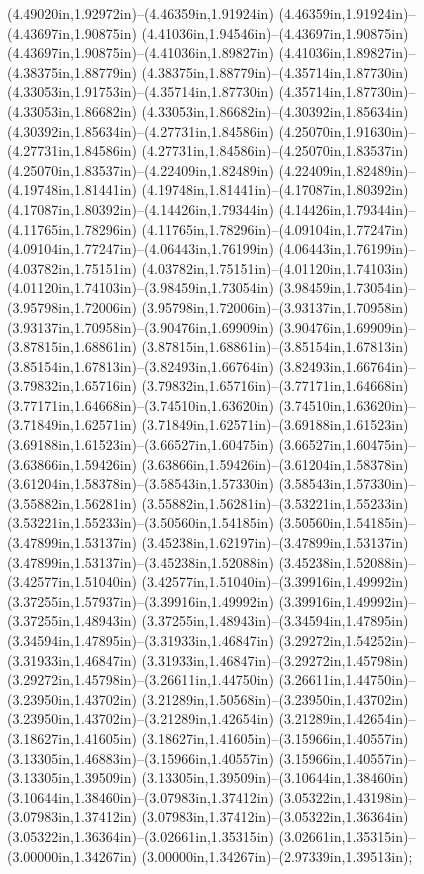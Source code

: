 (4.49020in,1.92972in)--(4.46359in,1.91924in) (4.46359in,1.91924in)--(4.43697in,1.90875in) (4.41036in,1.94546in)--(4.43697in,1.90875in) (4.43697in,1.90875in)--(4.41036in,1.89827in) (4.41036in,1.89827in)--(4.38375in,1.88779in) (4.38375in,1.88779in)--(4.35714in,1.87730in) (4.33053in,1.91753in)--(4.35714in,1.87730in) (4.35714in,1.87730in)--(4.33053in,1.86682in) (4.33053in,1.86682in)--(4.30392in,1.85634in) (4.30392in,1.85634in)--(4.27731in,1.84586in) (4.25070in,1.91630in)--(4.27731in,1.84586in) (4.27731in,1.84586in)--(4.25070in,1.83537in) (4.25070in,1.83537in)--(4.22409in,1.82489in) (4.22409in,1.82489in)--(4.19748in,1.81441in) (4.19748in,1.81441in)--(4.17087in,1.80392in) (4.17087in,1.80392in)--(4.14426in,1.79344in) (4.14426in,1.79344in)--(4.11765in,1.78296in) (4.11765in,1.78296in)--(4.09104in,1.77247in) (4.09104in,1.77247in)--(4.06443in,1.76199in) (4.06443in,1.76199in)--(4.03782in,1.75151in) (4.03782in,1.75151in)--(4.01120in,1.74103in) (4.01120in,1.74103in)--(3.98459in,1.73054in) (3.98459in,1.73054in)--(3.95798in,1.72006in) (3.95798in,1.72006in)--(3.93137in,1.70958in) (3.93137in,1.70958in)--(3.90476in,1.69909in) (3.90476in,1.69909in)--(3.87815in,1.68861in) (3.87815in,1.68861in)--(3.85154in,1.67813in) (3.85154in,1.67813in)--(3.82493in,1.66764in) (3.82493in,1.66764in)--(3.79832in,1.65716in) (3.79832in,1.65716in)--(3.77171in,1.64668in) (3.77171in,1.64668in)--(3.74510in,1.63620in) (3.74510in,1.63620in)--(3.71849in,1.62571in) (3.71849in,1.62571in)--(3.69188in,1.61523in) (3.69188in,1.61523in)--(3.66527in,1.60475in) (3.66527in,1.60475in)--(3.63866in,1.59426in) (3.63866in,1.59426in)--(3.61204in,1.58378in) (3.61204in,1.58378in)--(3.58543in,1.57330in) (3.58543in,1.57330in)--(3.55882in,1.56281in) (3.55882in,1.56281in)--(3.53221in,1.55233in) (3.53221in,1.55233in)--(3.50560in,1.54185in) (3.50560in,1.54185in)--(3.47899in,1.53137in) (3.45238in,1.62197in)--(3.47899in,1.53137in) (3.47899in,1.53137in)--(3.45238in,1.52088in) (3.45238in,1.52088in)--(3.42577in,1.51040in) (3.42577in,1.51040in)--(3.39916in,1.49992in) (3.37255in,1.57937in)--(3.39916in,1.49992in) (3.39916in,1.49992in)--(3.37255in,1.48943in) (3.37255in,1.48943in)--(3.34594in,1.47895in) (3.34594in,1.47895in)--(3.31933in,1.46847in) (3.29272in,1.54252in)--(3.31933in,1.46847in) (3.31933in,1.46847in)--(3.29272in,1.45798in) (3.29272in,1.45798in)--(3.26611in,1.44750in) (3.26611in,1.44750in)--(3.23950in,1.43702in) (3.21289in,1.50568in)--(3.23950in,1.43702in) (3.23950in,1.43702in)--(3.21289in,1.42654in) (3.21289in,1.42654in)--(3.18627in,1.41605in) (3.18627in,1.41605in)--(3.15966in,1.40557in) (3.13305in,1.46883in)--(3.15966in,1.40557in) (3.15966in,1.40557in)--(3.13305in,1.39509in) (3.13305in,1.39509in)--(3.10644in,1.38460in) (3.10644in,1.38460in)--(3.07983in,1.37412in) (3.05322in,1.43198in)--(3.07983in,1.37412in) (3.07983in,1.37412in)--(3.05322in,1.36364in) (3.05322in,1.36364in)--(3.02661in,1.35315in) (3.02661in,1.35315in)--(3.00000in,1.34267in) (3.00000in,1.34267in)--(2.97339in,1.39513in);
